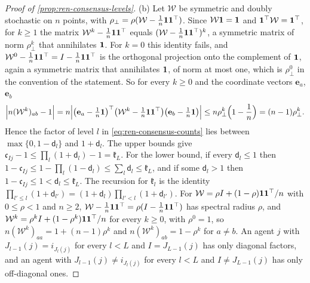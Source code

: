 \begin{proof}[Proof of \cref{prop:ren-consensus-levels}]
(b) Let $\mathcal W$ be symmetric and doubly stochastic on $n$ points, with $\rho_\perp=\rho(\mathcal W-\frac1n\mathbf{1}\mathbf{1}^\top)$. Since $\mathcal W\mathbf{1}=\mathbf{1}$ and $\mathbf{1}^\top\mathcal W=\mathbf{1}^\top$, for $k\ge1$ the matrix $\mathcal W^k-\frac1n\mathbf{1}\mathbf{1}^\top$ equals $(\mathcal W-\frac1n\mathbf{1}\mathbf{1}^\top)^k$, a symmetric matrix of norm $\rho_\perp^k$ that annihilates $\mathbf{1}$. For $k=0$ this identity fails, and $\mathcal W^0-\frac1n\mathbf{1}\mathbf{1}^\top=I-\frac1n\mathbf{1}\mathbf{1}^\top$ is the orthogonal projection onto the complement of $\mathbf{1}$, again a symmetric matrix that annihilates $\mathbf{1}$, of norm at most one, which is $\rho_\perp^0$ in the convention of the statement. So for every $k\ge0$ and the coordinate vectors $\mathbf e_a$, $\mathbf e_b$
\[
\Bigl\lvert n(\mathcal W^k)_{ab}-1\Bigr\rvert=n\Bigl\lvert\bigl(\mathbf e_a-\tfrac1n\mathbf{1}\bigr)^\top\bigl(\mathcal W^k-\tfrac1n\mathbf{1}\mathbf{1}^\top\bigr)\bigl(\mathbf e_b-\tfrac1n\mathbf{1}\bigr)\Bigr\rvert\le n\rho_\perp^k\Bigl(1-\frac1n\Bigr)=(n-1)\rho_\perp^k.
\]
Hence the factor of level $l$ in \eqref{eq:ren-consensus-counts} lies between $\max\{0,1-\mathsf d_l\}$ and $1+\mathsf d_l$. The upper bounds give $\mathfrak c_{Ij}-1\le\prod_l(1+\mathsf d_l)-1=\mathfrak k_L$. For the lower bound, if every $\mathsf d_l\le1$ then $1-\mathfrak c_{Ij}\le1-\prod_l(1-\mathsf d_l)\le\sum_l\mathsf d_l\le\mathfrak k_L$, and if some $\mathsf d_l>1$ then $1-\mathfrak c_{Ij}\le1<\mathsf d_l\le\mathfrak k_L$. The recursion for $\mathfrak k_l$ is the identity $\prod_{l'\le l}(1+\mathsf d_{l'})=(1+\mathsf d_l)\prod_{l'<l}(1+\mathsf d_{l'})$. For $\mathcal W=\rho I+(1-\rho)\mathbf{1}\mathbf{1}^\top/n$ with $0\le\rho<1$ and $n\ge2$, $\mathcal W-\frac1n\mathbf{1}\mathbf{1}^\top=\rho(I-\frac1n\mathbf{1}\mathbf{1}^\top)$ has spectral radius $\rho$, and $\mathcal W^k=\rho^kI+(1-\rho^k)\mathbf{1}\mathbf{1}^\top/n$ for every $k\ge0$, with $\rho^0=1$, so $n(\mathcal W^k)_{aa}=1+(n-1)\rho^k$ and $n(\mathcal W^k)_{ab}=1-\rho^k$ for $a\ne b$. An agent $j$ with $J_{l-1}(j)=i_{J_l(j)}$ for every $l<L$ and $I=J_{L-1}(j)$ has only diagonal factors, and an agent with $J_{l-1}(j)\ne i_{J_l(j)}$ for every $l<L$ and $I\ne J_{L-1}(j)$ has only off-diagonal ones.


\end{proof}
